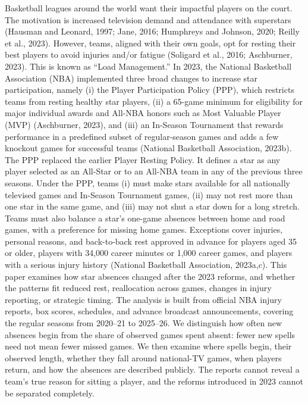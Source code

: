 \documentclass[11pt]{article}
\begin{document}
Basketball leagues around the world want their impactful players on the court. The motivation is increased television demand and attendance with superstars (Hausman and Leonard, 1997; Jane, 2016; Humphreys and Johnson, 2020; Reilly et al., 2023). However, teams, aligned with their own goals, opt for resting their best players to avoid injuries and/or fatigue (Soligard et al., 2016; Aschburner, 2023). This is known as ``Load Management.'' In 2023, the National Basketball Association (NBA) implemented three broad changes to increase star participation, namely (i) the Player Participation Policy (PPP), which restricts teams from resting healthy star players, (ii) a 65-game minimum for eligibility for major individual awards and All-NBA honors such as Most Valuable Player (MVP) (Aschburner, 2023), and (iii) an In-Season Tournament that rewards performance in a predefined subset of regular-season games and adds a few knockout games for successful teams (National Basketball Association, 2023b). The PPP replaced the earlier Player Resting Policy. It defines a star as any player selected as an All-Star or to an All-NBA team in any of the previous three seasons. Under the PPP, teams (i) must make stars available for all nationally televised games and In-Season Tournament games, (ii) may not rest more than one star in the same game, and (iii) may not shut a star down for a long stretch. Teams must also balance a star's one-game absences between home and road games, with a preference for missing home games. Exceptions cover injuries, personal reasons, and back-to-back rest approved in advance for players aged 35 or older, players with 34,000 career minutes or 1,000 career games, and players with a serious injury history (National Basketball Association, 2023a,c). This paper examines how star absences changed after the 2023 reforms, and whether the patterns fit reduced rest, reallocation across games, changes in injury reporting, or strategic timing. The analysis is built from official NBA injury reports, box scores, schedules, and advance broadcast announcements, covering the regular seasons from 2020--21 to 2025--26. We distinguish how often new absences begin from the share of observed games spent absent: fewer new spells need not mean fewer missed games. We then examine where spells begin, their observed length, whether they fall around national-TV games, when players return, and how the absences are described publicly. The reports cannot reveal a team's true reason for sitting a player, and the reforms introduced in 2023 cannot be separated completely.
\end{document}
